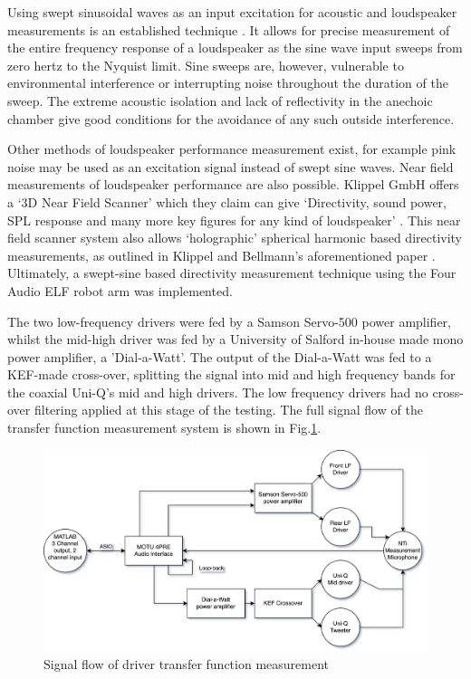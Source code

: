 \documentclass{report}
\begin{document}
        Using swept sinusoidal waves as an input excitation for acoustic and loudspeaker measurements is an established technique \cite{loudspeakersANSI}.
        It allows for precise measurement of the entire frequency response of a loudspeaker as the sine wave input sweeps from zero hertz to the Nyquist limit.
        Sine sweeps are, however, vulnerable to environmental interference or interrupting noise throughout the duration of the sweep.
        The extreme acoustic isolation and lack of reflectivity in the anechoic chamber give good conditions for the avoidance of any such outside interference.

        Other methods of loudspeaker performance measurement exist, for example pink noise may be used as an excitation signal instead of swept sine waves. 
        Near field measurements of loudspeaker performance are also possible.
        Klippel GmbH offers a `3D Near Field Scanner' which they claim can give `Directivity, sound power, SPL response and many more key figures for any kind of loudspeaker' \cite{klippelNFS}.
        This near field scanner system also allows `holographic' spherical harmonic based directivity measurements, as outlined in Klippel and Bellmann's aforementioned paper \cite{klippel2016holographic}. 
        Ultimately, a swept-sine based directivity measurement technique using the Four Audio ELF robot arm was implemented.

        The two low-frequency drivers were fed by a Samson Servo-500 power amplifier, whilst the mid-high driver was fed by a University of Salford in-house made mono power amplifier, a 'Dial-a-Watt'.
        The output of the Dial-a-Watt was fed to a KEF-made cross-over, splitting the signal into mid and high frequency bands for the coaxial Uni-Q's mid and high drivers.
        The low frequency drivers had no cross-over filtering applied at this stage of the testing.
        The full signal flow of the transfer function measurement system is shown in Fig.\ref{signalFlow}.

        \begin{figure}[H]
            \centering
            \includegraphics[scale=0.04]{figs/signalFlow.png}%
            \caption{Signal flow of driver transfer function measurement}
            \label{signalFlow}
        \end{figure}
        \newpage
\end{document}
